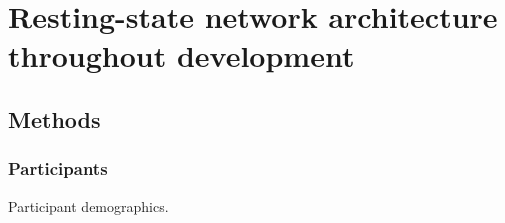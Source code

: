 \chapter{Resting-state network architecture throughout development}


\section{Methods}

\subsection{Participants}

\begin{table}
\scriptsize
\renewcommand{\tabcolsep}{0.09cm}
\centering

\caption{Participant demographics.}
\label{table:Ch5_Participants}
\end{table}